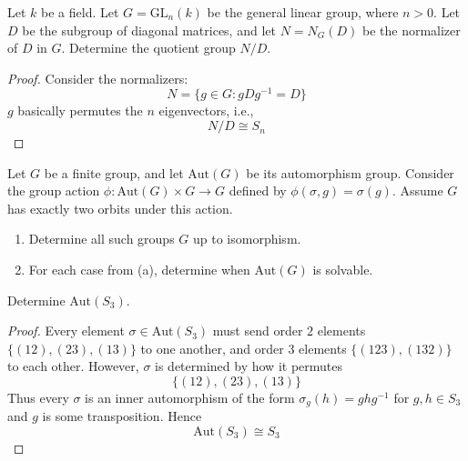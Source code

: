 \begin{prob}[S2005-Q1]
    Let $k$ be a field. Let $G = \mathrm{GL}_n(k)$ be the general linear group, where $n > 0$. Let $D$ be the subgroup of diagonal matrices, and let $N = N_G(D)$ be the normalizer of $D$ in $G$. Determine the quotient group $N/D$.
\end{prob}
\begin{proof}
    Consider the normalizers:
    \begin{equation*}
        N=\{g\in G: gDg^{-1}=D\}
    \end{equation*}
    $g$ basically permutes the $n$ eigenvectors, i.e., 
    \begin{equation*}
        N/D\cong S_n
    \end{equation*}
\end{proof}

\begin{prob}[F2009-Q1]
    Let \( G \) be a finite group, and let \( \mathrm{Aut}(G) \) be its automorphism group. Consider the group action \( \phi \colon \mathrm{Aut}(G) \times G \to G \) defined by \( \phi(\sigma, g) = \sigma(g) \). Assume \( G \) has exactly two orbits under this action.
    
    \begin{enumerate}
        \item Determine all such groups \( G \) up to isomorphism.
        
        \item For each case from (a), determine when \( \mathrm{Aut}(G) \) is solvable.
    \end{enumerate}
\end{prob}


\begin{prob}[F2016-Q1]
    Determine $\text{Aut}(S_3)$.
\end{prob}
\begin{proof}
    Every element $\sigma\in\text{Aut}(S_3)$ must send order $2$ elements $\{(12), (23), (13)\}$ to one another, and order $3$ elements $\{(123), (132)\}$ to each other. However, $\sigma$ is determined by how it permutes 
    \begin{equation*}
        \{(12), (23), (13)\}
    \end{equation*}
    Thus every $\sigma$ is an inner automorphism of the form $\sigma_g(h)=ghg^{-1}$ for $g,h\in S_3$ and $g$ is some transposition. Hence 
    \begin{equation*}
        \text{Aut}(S_3)\cong S_3
    \end{equation*}
\end{proof}


